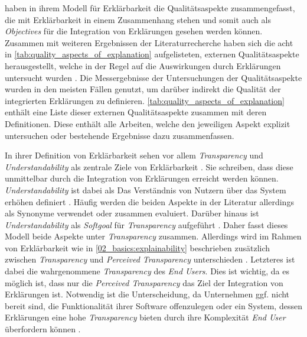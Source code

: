 \citeauthor{chazette_knowledge_nodate} haben in ihrem Modell für Erklärbarkeit die Qualitätsaspekte zusammengefasst, die mit Erklärbarkeit in einem Zusammenhang stehen und somit auch als \textit{Objectives} für die Integration von Erklärungen gesehen werden können. Zusammen mit weiteren Ergebnissen der Literaturrecherche haben sich die acht in \autoref{tab:quality_aspects_of_explanation} aufgelisteten, externen Qualitätsaspekte herausgestellt, welche in der Regel auf die Auswirkungen durch Erklärungen untersucht wurden \cite{nunes_systematic_2017, tintarev2007survey}. Die Messergebnisse der Untersuchungen der Qualitätsaspekte wurden in den meisten Fällen genutzt, um darüber indirekt die Qualität der integrierten Erklärungen zu definieren. \autoref{tab:quality_aspects_of_explanation} enthält eine Liste dieser externen Qualitätsaspekte zusammen mit deren Definitionen. Diese enthält alle Arbeiten, welche den jeweiligen Aspekt explizit untersuchen oder bestehende Ergebnisse dazu zusammenfassen.

In ihrer Definition von Erklärbarkeit sehen \citeauthor{chazette_knowledge_nodate} vor allem \textit{Transparency} und \textit{Understandability} als zentrale Ziele von Erklärbarkeit \cite{chazette_end-users_nodate}. Sie schreiben, dass diese unmittelbar durch die Integration von Erklärungen erreicht werden können. \textit{Understandability} ist dabei als \glqq Das Verständnis von Nutzern über das System erhöhen\grqq{} definiert \cite[vgl.][]{chazette_end-users_nodate}. Häufig werden die beiden Aspekte in der Literatur allerdings als Synonyme verwendet \cite{nunes_systematic_2017, carvalho2017quality,tintarev_designing_nodate} oder zusammen evaluiert. Darüber hinaus ist \textit{Understandability} als \textit{Softgoal} für \textit{Transparency} aufgeführt \cite{do2010software}. Daher fasst dieses Modell beide Aspekte unter \textit{Transparency} zusammen. Allerdings wird im Rahmen von Erklärbarkeit wie in \autoref{02_basics:explainability} beschrieben zusätzlich zwischen \textit{Transparency} und \textit{Perceived Transparency} unterschieden \cite{nunes_systematic_2017}. Letzteres ist dabei die wahrgenommene \textit{Transparency} des \textit{End Users}. Dies ist wichtig, da es möglich ist, dass nur die \textit{Perceived Transparency} das Ziel der Integration von Erklärungen ist. Notwendig ist die Unterscheidung, da Unternehmen ggf. nicht bereit sind, die Funktionalität ihrer Software offenzulegen oder ein System, dessen Erklärungen eine hohe \textit{Transparency} bieten durch ihre Komplexität \textit{End User} überfordern können \cite{chazette_knowledge_nodate}.

